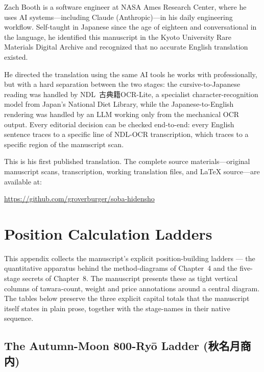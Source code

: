 \documentclass[10pt, openany]{book}
\newcommand{\jp}[1]{{\japanesefont #1}}
\begin{document}
Zach Booth is a software engineer at NASA Ames Research Center, where
he uses AI systems---including Claude (Anthropic)---in his daily
engineering workflow. Self-taught in Japanese since the age of eighteen
and conversational in the language, he identified this manuscript in
the Kyoto University Rare Materials Digital Archive and recognized that
no accurate English translation existed.

He directed the translation using the same AI tools he works with
professionally, but with a hard separation between the two stages:
the cursive-to-Japanese reading was handled by NDL~\jp{古典籍OCR-Lite},
a specialist character-recognition model from Japan's National Diet
Library, while the Japanese-to-English rendering was handled by an
LLM working only from the mechanical OCR output. Every editorial
decision can be checked end-to-end: every English sentence traces
to a specific line of NDL-OCR transcription, which traces to a
specific region of the manuscript scan.

\begin{sloppypar}
This is his first published translation. The complete source
materials---original manuscript scans, transcription, working
translation files, and \LaTeX{} source---are available at:\\
\end{sloppypar}
\url{https://github.com/groverburger/soba-hidensho}

\appendix
\chapter{Position Calculation Ladders}
\label{app:calctables}

This appendix collects the manuscript's explicit position-building
ladders --- the quantitative apparatus behind the method-diagrams of
Chapter~4 and the five-stage secrets of Chapter~8. The manuscript
presents these as tight vertical columns of tawara-count, weight and
price annotations around a central diagram. The tables below
preserve the three explicit capital totals that the manuscript
itself states in plain prose, together with the stage-names in
their native sequence.

\section{The Autumn-Moon 800-Ry\=o Ladder (\jp{秋名月商内})}
\end{document}
